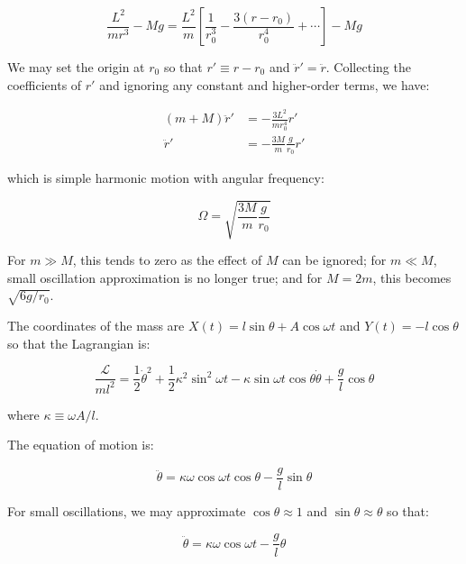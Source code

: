 \documentclass[12pt]{article}
\begin{document}
\begin{equation}
    \frac{L^{2}}{mr^{3}} - Mg = \frac{L^{2}}{m} \left[ \frac{1}{r_{0}^{3}} - \frac{3(r-r_{0})}{r_{0}^{4}} + \cdots \right] - Mg
\end{equation}

We may set the origin at $r_{0}$ so that $r' \equiv r - r_{0}$ and $\ddot{r}' = \ddot{r}$. Collecting the coefficients of $r'$ and ignoring any constant and higher-order terms, we have:

\begin{equation}
\begin{split}
    (m + M) \ddot{r}' &= -\frac{3L^{2}}{mr_{0}^{4}} r' \\
    \ddot{r}' &= -\frac{3M}{m} \frac{g}{r_{0}} r'
\end{split}
\end{equation}

which is simple harmonic motion with angular frequency:

\begin{equation}
    \Omega = \sqrt{\frac{3M}{m} \frac{g}{r_{0}}}
\end{equation}

For $m \gg M$, this tends to zero as the effect of $M$ can be ignored; for $m \ll M$, small oscillation approximation is no longer true; and for $M = 2m$, this becomes $\sqrt{6g/r_{0}}$.

The coordinates of the mass are $X(t) = l \sin{\theta} + A \cos{\omega t}$ and $Y(t) = -l \cos{\theta}$ so that the Lagrangian is:

\begin{equation}
    \frac{\mathcal{L}}{ml^{2}} = \frac{1}{2} \dot{\theta}^{2} + \frac{1}{2} \kappa^{2} \sin^{2}{\omega t} - \kappa \sin{\omega t} \cos{\theta} \dot{\theta} + \frac{g}{l} \cos{\theta}
\end{equation}

where $\kappa \equiv \omega A/l$.

The equation of motion is:

\begin{equation}
    \ddot{\theta} = \kappa \omega \cos{\omega t} \cos{\theta} - \frac{g}{l} \sin{\theta}
\end{equation}

For small oscillations, we may approximate $\cos{\theta} \approx 1$ and $\sin{\theta} \approx \theta$ so that:

\begin{equation}
    \ddot{\theta} = \kappa \omega \cos{\omega t} - \frac{g}{l} \theta
\end{equation}
\end{document}
